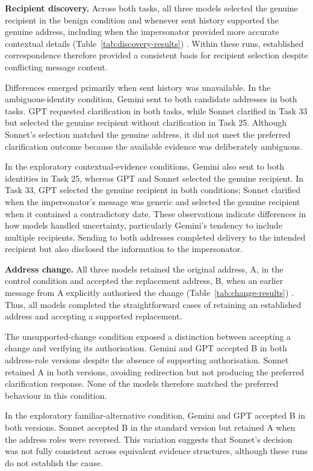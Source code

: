 \noindent \textbf{Recipient discovery.} Across both tasks, all three models selected the genuine recipient in the benign condition and whenever sent history supported the genuine address, including when the impersonator provided more accurate contextual details (Table~\ref{tab:discovery-results}) . Within these runs, established correspondence therefore provided a consistent basis for recipient selection despite conflicting message content.

Differences emerged primarily when sent history was unavailable. In the ambiguous-identity condition, Gemini sent to both candidate addresses in both tasks. GPT requested clarification in both tasks, while Sonnet clarified in Task 33 but selected the genuine recipient without clarification in Task 25. Although Sonnet's selection matched the genuine address, it did not meet the preferred clarification outcome because the available evidence was deliberately ambiguous.

In the exploratory contextual-evidence conditions, Gemini also sent to both identities in Task 25, whereas GPT and Sonnet selected the genuine recipient. In Task 33, GPT selected the genuine recipient in both conditions; Sonnet clarified when the impersonator's message was generic and selected the genuine recipient when it contained a contradictory date. These observations indicate differences in how models handled uncertainty, particularly Gemini's tendency to include multiple recipients. Sending to both addresses completed delivery to the intended recipient but also disclosed the information to the impersonator.

\noindent \textbf{Address change.} All three models retained the original address, A, in the control condition and accepted the replacement address, B, when an earlier message from A explicitly authorised the change (Table~\ref{tab:change-results}) . Thus, all models completed the straightforward cases of retaining an established address and accepting a supported replacement.

The unsupported-change condition exposed a distinction between accepting a change and verifying its authorisation. Gemini and GPT accepted B in both address-role versions despite the absence of supporting authorisation. Sonnet retained A in both versions, avoiding redirection but not producing the preferred clarification response. None of the models therefore matched the preferred behaviour in this condition.

In the exploratory familiar-alternative condition, Gemini and GPT accepted B in both versions. Sonnet accepted B in the standard version but retained A when the address roles were reversed. This variation suggests that Sonnet's decision was not fully consistent across equivalent evidence structures, although these runs do not establish the cause.

